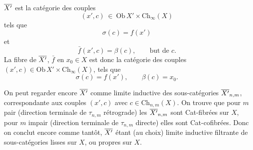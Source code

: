 $\overline{X'}$ est la catégorie des couples
\[
(x',c) \ \in \ \mathrm{Ob}\,X' \times \mathrm{Ch}_\infty(X)
\]
tels que
\[
\sigma(c) = f(x')
\]
et
\[
\bar f(x',c) = \beta(c), \qquad \text{but de } c.
\]
La fibre de $\overline{X'}$, $\bar f$ en $x_0 \in X$ est donc la catégorie des couples $(x',c) \in \mathrm{Ob}\,X' \times \mathrm{Ch}_\infty(X)$, tels que
\[
\sigma(c) = f(x'), \qquad \beta(c) = x_0.
\]

On peut regarder encore $\overline{X'}$ comme limite inductive des sous-catégories $\overline{X'}_{n,m}$, correspondante aux couples $(x',c)$ avec $c \in \mathrm{Ch}_{n,m}(X)$. On trouve que pour $m$ pair (direction terminale de $\tau_{n,m}$ rétrograde) les $\overline{X'}_{n,m}$ sont Cat-fibrées sur $X$, pour $m$ impair (direction terminale de $\tau_{n,m}$ directe) elles sont Cat-cofibrées. Donc on conclut encore comme tantôt, $\overline{X'}$ étant (au choix) limite inductive filtrante de sous-catégories lisses sur $X$, ou propres sur $X$. %

